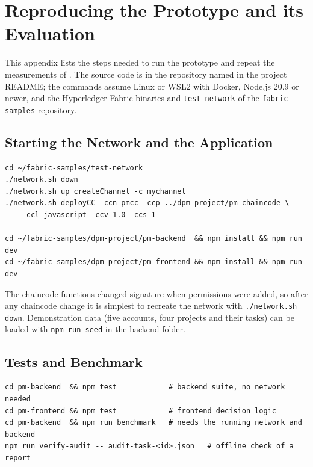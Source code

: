 \chapter{Reproducing the Prototype and its Evaluation}
\label{app:reproduce}

This appendix lists the steps needed to run the prototype and repeat the measurements of . The source code is in the repository named in the project README; the commands assume Linux or WSL2 with Docker, Node.js 20.9 or newer, and the Hyperledger Fabric binaries and \texttt{test-network} of the \texttt{fabric-samples} repository.

\section{Starting the Network and the Application}
\label{app:start}

\begin{lstlisting}[numbers=none, language={}, basicstyle=\ttfamily\footnotesize]
cd ~/fabric-samples/test-network
./network.sh down
./network.sh up createChannel -c mychannel
./network.sh deployCC -ccn pmcc -ccp ../dpm-project/pm-chaincode \
    -ccl javascript -ccv 1.0 -ccs 1

cd ~/fabric-samples/dpm-project/pm-backend  && npm install && npm run dev
cd ~/fabric-samples/dpm-project/pm-frontend && npm install && npm run dev
\end{lstlisting}

The chaincode functions changed signature when permissions were added, so after any chaincode change it is simplest to recreate the network with \texttt{./network.sh down}. Demonstration data (five accounts, four projects and their tasks) can be loaded with \texttt{npm run seed} in the backend folder.

\clearpage
\section{Tests and Benchmark}
\label{app:tests}

\begin{lstlisting}[numbers=none, language={}, basicstyle=\ttfamily\footnotesize]
cd pm-backend  && npm test            # backend suite, no network needed
cd pm-frontend && npm test            # frontend decision logic
cd pm-backend  && npm run benchmark   # needs the running network and backend
npm run verify-audit -- audit-task-<id>.json   # offline check of a report
\end{lstlisting}

